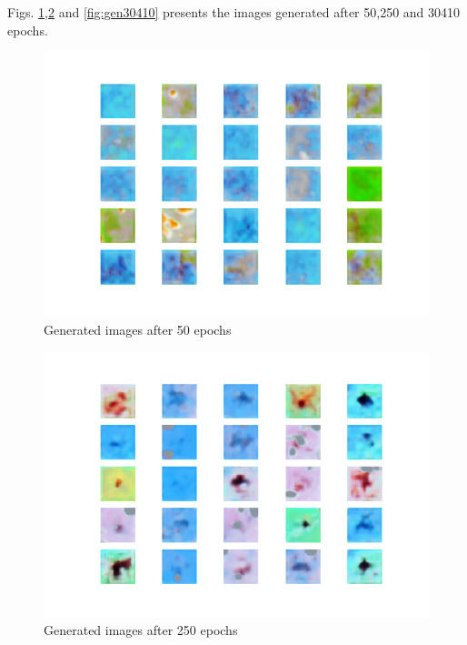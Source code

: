 



Figs. \ref{fig:gen50},\ref{fig:gen250} and \ref{fig:gen30410} presents the images generated after 50,250 and 30410 epochs.

\begin{figure}[h]
\caption{Generated images after 50 epochs}
\label{fig:gen50}
\begin{center}
\includegraphics[scale=0.45]{./images/generation/alta_mnist_50.png} \end{center}
\end{figure}

\begin{figure}[h]
\caption{Generated images after 250 epochs}
\label{fig:gen250}
\begin{center}
\includegraphics[scale=0.45]{./images/generation/alta_mnist_250.png} \end{center}
\end{figure}

